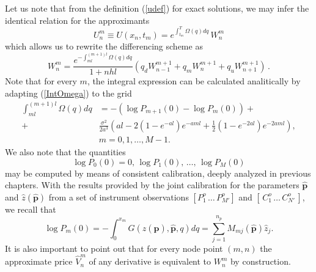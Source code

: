 Let us note that from the definition (\ref{udef}) for exact solutions,
we may infer the identical relation for the approximants
\begin{equation}
\label{UtoW}
U^m_n \equiv U(x_n , t_m ) = e^{\int_{t_m}^T \Omega(q) dq}\, W^m_n
\end{equation}
which allows us to rewrite the differencing scheme as
$$
W^m_n = \displaystyle \frac{ e^{-\int^{(m+1)l}_{ml} \Omega(q) dq} }{1+ nhl } \left(
  q_d W^{m+1}_{n-1} + q_m W^{m+1}_n + 
  q_u W^{m+1}_{n+1} \right)\, .
$$
Note that for every $m$, the integral expression can be calculated
analitically by adapting (\ref{IntOmega}) to the grid
\begin{equation}
\label{discIntOmega}
\begin{split}
\int_{m l}^{(m+1) l} \Omega(q) dq & = -\left( \log P_{m+1}(0) - \log P_{m}(0) \right) + \\
 + & \frac{\sigma^2}{2 a^3} \left( a l - 2 ( 1 - e^{-al} )e^{-a m l} +
  \frac{1}{2} (1 - e^{-2 a l} ) e^{-2 a m l} \right), \\
 & m = 0, 1, \dots, M-1.
\end{split}
\end{equation}
We also note that the quantities 
$$
\log P_0(0)= 0,\, \log P_1(0),\, \dots,\, \log P_M(0)
$$
may be computed by means of consistent calibration, deeply analyzed
in previous chapters. With the results provided by the joint
calibration for the parameters $\boldsymbol{\hat{p}}$ and
$\hat{z}(\boldsymbol{\hat{p}})$  from a set of instrument observations 
$[P^o_1 \,\dots\, P^o_{M'}]$ and 
$[\, C^o_1 \,\dots\, C^o_{N'} \,]$, we recall that
$$
\log P_m(0)= -\int^{x_m}_0 G(z(\boldsymbol{\hat{p}}), \boldsymbol{\hat{p}}, q) dq =
\sum^{n_p}_{j=1} M_{mj} ( \boldsymbol{\hat{p}}) \hat{z}_j.
$$
It is also important to point out that for every node point $(m,n)$
the approximate price $\widehat{V}^m_n$ of any derivative is
equivalent to $W^m_n$ by construction. 

